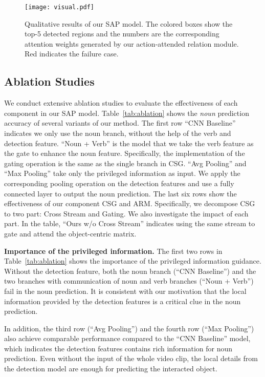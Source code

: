 \documentclass[letterpaper]{article} \usepackage{aaai20}  \usepackage{times}  \usepackage{helvet} \usepackage{courier}  \usepackage[hyphens]{url}  \usepackage{graphicx} \urlstyle{rm} \def\UrlFont{\rm}  \usepackage{graphicx}  \frenchspacing  \setlength{\pdfpagewidth}{8.5in}  \setlength{\pdfpageheight}{11in}  \usepackage{amsfonts,amssymb}
\begin{document}
\begin{figure*}[t]
\center
\texttt{[image: visual.pdf]}
\caption{
Qualitative results of our SAP model. The colored boxes show the top-5 detected regions and the numbers are the corresponding attention weights generated by our action-attended relation module. Red indicates the failure case.
}
\label{fig:visual}  
\end{figure*}


\subsection{Ablation Studies}
We conduct extensive ablation studies to evaluate the effectiveness of each component in our SAP model. 
Table~\ref{tab:ablation} shows the \textit{noun} prediction accuracy of several variants of our method.
The first row ``CNN Baseline'' indicates we only use the noun branch, without the help of the verb and detection feature.
``Noun + Verb'' is the model that we take the verb feature as the gate to enhance the noun feature. Specifically, the implementation of the gating operation is the same as the single branch in CSG.
``Avg Pooling'' and ``Max Pooling'' take only the privileged information as input. We apply the corresponding pooling operation on the  detection features and use a fully connected layer to output the noun prediction. 
The last six rows show the effectiveness of our component CSG and ARM. Specifically, we decompose CSG to two part: Cross Stream and Gating. We also investigate the impact of each part.
In the table, ``Ours w/o Cross Stream'' indicates using the same stream to gate and attend the object-centric matrix. 



\textbf{Importance of the privileged information.}
The first two rows in Table~\ref{tab:ablation} shows the importance of the privileged information guidance. 
Without the detection feature, both the noun branch (``CNN Baseline'') and the two branches with communication of noun and verb branches (``Noun + Verb'') fail in the noun prediction.
It is consistent with our motivation that the local information provided by the detection features is a critical clue in the noun prediction.

In addition, the third row (``Avg Pooling'') and the fourth row (``Max Pooling'') also achieve comparable performance compared to the ``CNN Baseline'' model, which indicates the detection features contains rich information for noun prediction. Even without the input of the whole video clip, the local details from the detection model are enough for predicting the interacted object.
\end{document}
